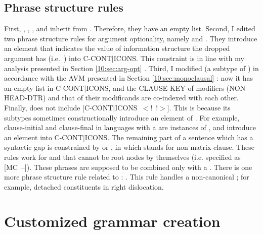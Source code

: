 \subsection{Phrase structure rules}
\label{11:ssec:phr}


First, , ,
, and  inherit
from . Therefore, they have an empty 
list.  Second, I edited two phrase structure rules for argument
optionality, namely
 and
. They
introduce an  element that indicates the value of
information structure the dropped argument has (i.e.\ )
into C-CONT{$\mid$}ICONS. This constraint is in line with my analysis
presented in Section \ref{10:sec:arg-opt} .  Third, I modified
 (a subtype of
) in accordance with the AVM presented in
Section \ref{10:sec:monoclausal} : now it has an
empty list in C-CONT{$\mid$}ICONS, and the CLAUSE-KEY of modifiers
(NON-HEAD-DTR) and that of their modificands are co-indexed with each
other. Finally,  does not
include \mbox{[C-CONT{$\mid$}ICONS \ensuremath{<}!
    !\ensuremath{>}]}. This is because its subtypes sometimes
constructionally introduce an element of
.
For example, clause-initial and clause-final  in languages
with a  are instances of
, and introduce an element into
C-CONT{$\mid$}ICONS.  The remaining part of a sentence which has a
syntactic gap is constrained by  or
, in which  stands for
non-matrix-clause.  These rules work for  and
 that cannot be root nodes by themselves
(i.e. specified as \mbox{[MC --]}). These phrases are supposed to be
combined only with a .  There is one more phrase
structure rule related to :
. This rule handles a non-canonical
; for example, detached constituents in right
dislocation.





\section{Customized grammar creation}
\label{11:sec:creation}

